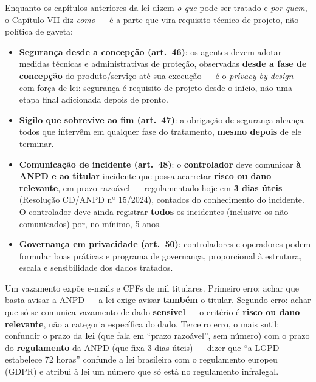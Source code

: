 \begin{conceito}
Enquanto os capítulos anteriores da lei dizem \emph{o que} pode ser
tratado e \emph{por quem}, o Capítulo VII diz \emph{como} --- é a parte
que vira requisito técnico de projeto, não política de gaveta:

\begin{itemize}
\item \textbf{Segurança desde a concepção (art.\ 46)}: os agentes devem
adotar medidas técnicas e administrativas de proteção, observadas
\textbf{desde a fase de concepção} do produto/serviço até sua execução ---
é o \textit{privacy by design} com força de lei: segurança é requisito de
projeto desde o início, não uma etapa final adicionada depois de pronto.
\item \textbf{Sigilo que sobrevive ao fim (art.\ 47)}: a obrigação de
segurança alcança todos que intervêm em qualquer fase do tratamento,
\textbf{mesmo depois} de ele terminar.
\item \textbf{Comunicação de incidente (art.\ 48)}: o \textbf{controlador}
deve comunicar \textbf{à ANPD e ao titular} incidente que possa acarretar
\textbf{risco ou dano relevante}, em prazo razoável --- regulamentado hoje
em \textbf{3 dias úteis} (Resolução CD/ANPD nº 15/2024), contados do
conhecimento do incidente. O controlador deve ainda registrar
\textbf{todos} os incidentes (inclusive os não comunicados) por, no
mínimo, 5 anos.
\item \textbf{Governança em privacidade (art.\ 50)}: controladores e
operadores podem formular boas práticas e programa de governança,
proporcional à estrutura, escala e sensibilidade dos dados tratados.
\end{itemize}
\end{conceito}

\begin{exemplo}
Um vazamento expõe e-mails e CPFs de mil titulares. Primeiro erro:
achar que basta avisar a ANPD --- a lei exige avisar \textbf{também} o
titular. Segundo erro: achar que só se comunica vazamento de dado
\textbf{sensível} --- o critério é \textbf{risco ou dano relevante}, não a
categoria específica do dado. Terceiro erro, o mais sutil: confundir o
prazo da \textbf{lei} (que fala em “prazo razoável”, sem número) com o
prazo do \textbf{regulamento} da ANPD (que fixa 3 dias úteis) --- dizer
que “a LGPD estabelece 72 horas” confunde a lei brasileira com o
regulamento europeu (GDPR) e atribui à lei um número que só está no
regulamento infralegal.
\end{exemplo}

